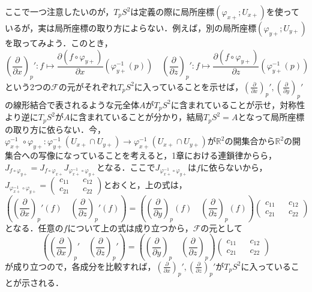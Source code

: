 \documentclass{jsarticle}
\def\vecb{\begin{pmatrix}}
\def\vece{\end{pmatrix}}
\def\realnum{{\mathbb R}}
\def\dfrac{\displaystyle\frac}
\def\delxp{\left(\dfrac{\partial}{\partial x}\right)_p}
\def\delyp{\left(\dfrac{\partial}{\partial y}\right)_p}
\def\delzp{\left(\dfrac{\partial}{\partial z}\right)_p}
\begin{document}
ここで一つ注意したいのが，$T_pS^2$は定義の際に局所座標$(\varphi_{x+};U_{x+})$を使っているが，実は局所座標の取り方によらない．例えば，別の局所座標$(\varphi_{y+};U_{y+})$を取ってみよう．このとき，
$$
\delxp':f\mapsto \dfrac{\partial (f\circ\varphi_{y+})}{\partial x}(\varphi_{y+}^{-1}(p))\quad
\delzp':f\mapsto \dfrac{\partial (f\circ\varphi_{y+})}{\partial z}(\varphi_{y+}^{-1}(p))
$$
という2つの$\mathcal F$の元がそれぞれ$T_pS^2$に入っていることを示せば，$\delxp',\delyp'$の線形結合で表されるような元全体$A$が$T_pS^2$に含まれていることが示せ，対称性より逆に$T_pS^2$が$A$に含まれていることが分かり，結局$T_pS^2=A$となって局所座標の取り方に依らない．今，$\varphi_{x+}^{-1}\circ\varphi_{y+}:\varphi_{y+}^{-1}(U_{x+}\cap U_{y+})\rightarrow\varphi_{x+}^{-1}(U_{x+}\cap U_{y+})$が$\realnum^2$の開集合から$\realnum^2$の開集合への写像になっていることを考えると，1章における連鎖律からら，$J_{f\circ\varphi_{y+}}=J_{f\circ\varphi_{x+}}J_{\varphi_{x+}^{-1}\circ\varphi_{y+}}$となる．ここで$J_{\varphi_{x+}^{-1}\circ\varphi_{y+}}$は$f$に依らないから，$J_{\varphi_{x+}^{-1}\circ\varphi_{y+}}=\vecb c_{11} && c_{12} \\ c_{21} && c_{22}\vece$とおくと，上の式は，
$$
\left(\delxp'(f)\quad\delzp'(f)\right)=\left(\delyp(f)\quad\delzp(f)\right)\vecb c_{11} && c_{12} \\ c_{21} && c_{22}\vece
$$
となる．任意の$f$について上の式は成り立つから，$\mathcal F$の元として
$$
\left(\delxp'\quad\delzp'\right)=\left(\delyp\quad\delzp\right)\vecb c_{11} && c_{12} \\ c_{21} && c_{22}\vece
$$
が成り立つので，各成分を比較すれば，$\delxp',\delzp'$が$T_pS^2$に入っていることが示される．
\end{document}
